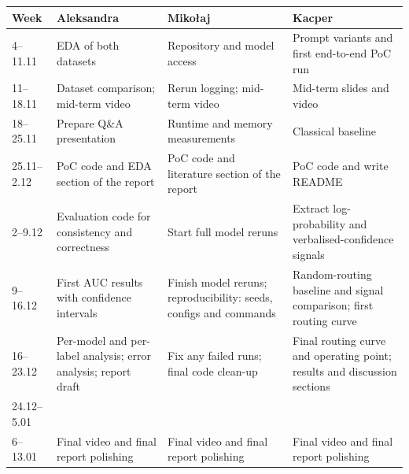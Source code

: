 \documentclass[11pt]{article}
\begin{document}
\vspace{1em}


\begin{center}
\footnotesize
\renewcommand{\arraystretch}{1.1}
\begin{tabularx}{\textwidth}{@{}
l
>{\raggedright\arraybackslash}X
>{\raggedright\arraybackslash}X
>{\raggedright\arraybackslash}X
@{}}
\toprule
\textbf{Week} & \textbf{Aleksandra} & \textbf{Mikołaj} & \textbf{Kacper} \\
\midrule
4--11.11 & EDA of both datasets & Repository and model access & Prompt variants and first end-to-end PoC run \\
11--18.11 & Dataset comparison; mid-term video & Rerun logging; mid-term video & Mid-term slides and video \\
\midrule
18--25.11 & Prepare Q\&A presentation & Runtime and memory measurements & Classical baseline\\
25.11--2.12 & PoC code and EDA section of the report & PoC code and literature section of the report & PoC code and write README \\
\midrule
2--9.12 & Evaluation code for consistency and correctness & Start full model reruns & Extract log-probability and verbalised-confidence signals \\
9--16.12 & First AUC results with confidence intervals & Finish model reruns; reproducibility: seeds, configs and commands & Random-routing baseline and signal comparison; first routing curve \\
16--23.12 & Per-model and per-label analysis; error analysis; report draft & Fix any failed runs; final code clean-up & Final routing curve and operating point; results and discussion sections \\
24.12--5.01 & \multicolumn{3}{c}{\textit{Winter break}} \\
6--13.01 & Final video and final report polishing & Final video and final report polishing & Final video and final report polishing \\
\bottomrule
\end{tabularx}

\label{tab:project-plan}
\end{center}
\end{document}
